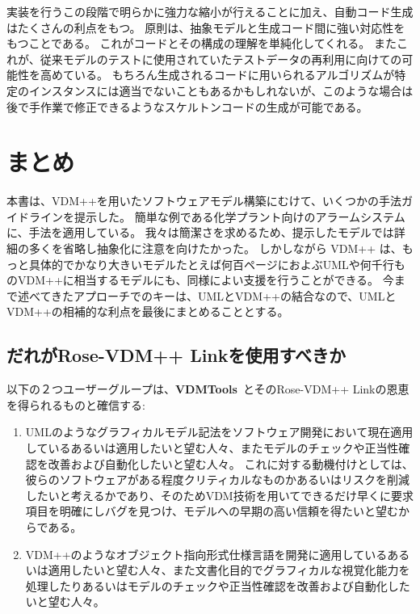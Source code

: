\documentclass[\pformat,12pt,twoside]{jarticle}
\newcommand{\vdmtools}{\textbf{VDMTools}}
\begin{document}
実装を行うこの段階で明らかに強力な縮小が行えることに加え、自動コード生成はたくさんの利点をもつ。
原則は、抽象モデルと生成コード間に強い対応性をもつことである。
これがコードとその構成の理解を単純化してくれる。
またこれが、従来モデルのテストに使用されていたテストデータの再利用に向けての可能性を高めている。
もちろん生成されるコードに用いられるアルゴリズムが特定のインスタンスには適当でないこともあるかもしれないが、このような場合は後で手作業で修正できるようなスケルトンコードの生成が可能である。

\section{まとめ}

本書は、VDM++を用いたソフトウェアモデル構築にむけて、いくつかの手法ガイドラインを提示した。
簡単な例である化学プラント向けのアラームシステムに、手法を適用している。
我々は簡潔さを求めるため、提示したモデルでは詳細の多くを省略し抽象化に注意を向けたかった。
しかしながら VDM++ は、もっと具体的でかなり大きいモデルたとえば何百ページにおよぶUMLや何千行ものVDM++に相当するモデルにも、同様によい支援を行うことができる。
今まで述べてきたアプローチでのキーは、UMLとVDM++の結合なので、UMLとVDM++の相補的な利点を最後にまとめることとする。

\subsection{だれがRose-VDM++ Linkを使用すべきか}

以下の２つユーザーグループは、\vdmtools\ とそのRose-VDM++ Linkの恩恵を得られるものと確信する:

\begin{enumerate}
\item
UMLのようなグラフィカルモデル記法をソフトウェア開発において現在適用しているあるいは適用したいと望む人々、またモデルのチェックや正当性確認を改善および自動化したいと望む人々。
これに対する動機付けとしては、彼らのソフトウェアがある程度クリティカルなものかあるいはリスクを削減したいと考えるかであり、そのためVDM技術を用いてできるだけ早くに要求項目を明確にしバグを見つけ、モデルへの早期の高い信頼を得たいと望むからである。

\item
VDM++のようなオブジェクト指向形式仕様言語を開発に適用しているあるいは適用したいと望む人々、また文書化目的でグラフィカルな視覚化能力を処理したりあるいはモデルのチェックや正当性確認を改善および自動化したいと望む人々。
\end{enumerate}
\end{document}
